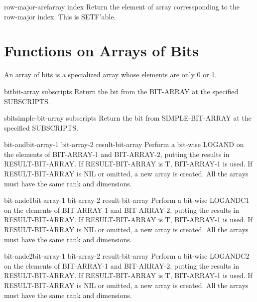 \documentclass[10pt,english]{book}
\begin{document}
\begin{accessor}{row-major-aref}{array index}
  Return the element of array corressponding to the row-major index. This is
   SETF'able.
\end{accessor}

\section{Functions on Arrays of Bits}
\label{sec:funct-arrays-bits}

An array of bits is a specialized array whose elements are only 0 or
1.

\begin{accessor}{bit}{bit-array \rest subscripts}
  Return the bit from the BIT-ARRAY at the specified SUBSCRIPTS.
\end{accessor}

\begin{accessor}{sbit}{simple-bit-array \rest subscripts}
  Return the bit from SIMPLE-BIT-ARRAY at the specified SUBSCRIPTS.
\end{accessor}

\begin{function}{bit-and}{bit-array-1 bit-array-2 \op result-bit-array}
  Perform a bit-wise LOGAND on the elements of BIT-ARRAY-1 and BIT-ARRAY-2,
  putting the results in RESULT-BIT-ARRAY. If RESULT-BIT-ARRAY is T,
  BIT-ARRAY-1 is used. If RESULT-BIT-ARRAY is NIL or omitted, a new array is
  created. All the arrays must have the same rank and dimensions.
\end{function}

\begin{function}{bit-andc1}{bit-array-1 bit-array-2 \op result-bit-array}
  Perform a bit-wise LOGANDC1 on the elements of BIT-ARRAY-1 and BIT-ARRAY-2,
  putting the results in RESULT-BIT-ARRAY. If RESULT-BIT-ARRAY is T,
  BIT-ARRAY-1 is used. If RESULT-BIT-ARRAY is NIL or omitted, a new array is
  created. All the arrays must have the same rank and dimensions.
\end{function}

\begin{function}{bit-andc2}{bit-array-1 bit-array-2 \op result-bit-array}
  Perform a bit-wise LOGANDC2 on the elements of BIT-ARRAY-1 and BIT-ARRAY-2,
  putting the results in RESULT-BIT-ARRAY. If RESULT-BIT-ARRAY is T,
  BIT-ARRAY-1 is used. If RESULT-BIT-ARRAY is NIL or omitted, a new array is
  created. All the arrays must have the same rank and dimensions.
\end{function}
\end{document}
